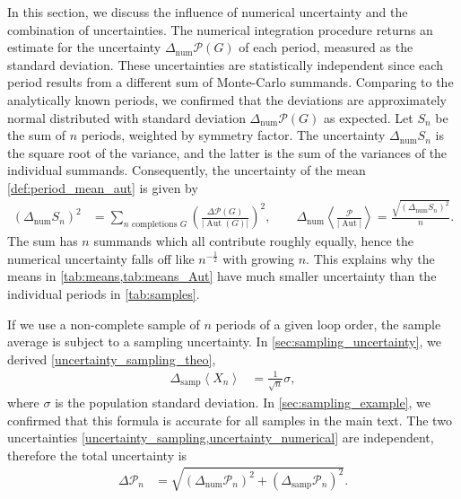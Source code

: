 \documentclass[12pt,a4paper]{article}
\newcommand{\abs}[1]{\lvert #1 \rvert}
\newcommand{\period}{\mathcal P}
\newcommand{\Aut}{\operatorname{Aut}}
\renewcommand{\|}{\rule[-0.4ex]{0.2ex}{1.2em}}
\begin{document}
In this section, we discuss the influence of numerical uncertainty and the combination of uncertainties.
The numerical integration procedure returns an estimate for the uncertainty $\Delta_\text{num} \period(G)$ of each period, measured as the   standard deviation. These uncertainties are statistically independent  since each period  results from a different sum of   Monte-Carlo summands. Comparing to the analytically known periods, we confirmed that the deviations are approximately normal distributed with standard deviation $  \Delta_\text{num} \period(G)$ as expected.  Let $S_n$ be the sum of $n$ periods, weighted by symmetry factor. The uncertainty $ \Delta_\text{num} S_n$ is the square root of the variance, and the latter is the sum of the variances of the individual summands. Consequently, the uncertainty of the mean \cref{def:period_mean_aut} is given by
\begin{align}\label{uncertainty_numerical}
	\left( \Delta_\text{num} S_n \right) ^2 &=\sum_{ n \text{ completions }G } \left(\frac{\Delta \period(G)} {  \abs{\Aut(G)}}  \right)^2,  \qquad  \Delta_\text{num} \left \langle \frac{\period}{\abs{\Aut }} \right \rangle  = \frac{\sqrt{\left( \Delta_\text{num} S_n \right) ^2 }}{n}    .
\end{align} 
The sum   has $n$ summands which all contribute roughly equally, hence the numerical uncertainty falls off  like $n ^{-\frac 12}$ with growing $n$. This explains why the means in \cref{tab:means,tab:means_Aut} have much smaller uncertainty than the individual periods in \cref{tab:samples}. 

If we use a non-complete sample of $n$ periods of a given loop order, the sample average is subject to a sampling uncertainty. In \cref{sec:sampling_uncertainty}, we derived \cref{uncertainty_sampling_theo},
\begin{align}\label{uncertainty_sampling}
	\Delta_{\text{samp}} \left \langle X_n \right \rangle  &= \frac{1}{\sqrt n } \sigma,
\end{align}
where $\sigma$ is the population standard deviation. In \cref{sec:sampling_example}, we confirmed that this formula is accurate for all samples in the main text. 
The two uncertainties \cref{uncertainty_sampling,uncertainty_numerical} are  independent, therefore the total uncertainty is
\begin{align}\label{uncertainty_combined}
\Delta \period_n &= \sqrt{\left(\Delta_\text{num} \period_n\right) ^ 2  +   \left( \Delta_\text{samp}  \period_n \right)^2 }  .
\end{align}
\end{document}
